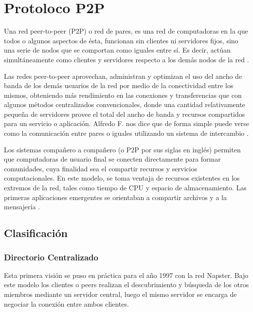 
\chapter{Protoloco P2P} %

\label{ch:protocolo_p2p} %

Una red peer-to-peer (P2P) o red de pares, es una red de computadoras en la que todos o algunos aspectos de ésta, funcionan sin clientes ni servidores fijos, sino una serie de nodos que se comportan como iguales entre sí. Es decir, actúan simultáneamente como clientes y servidores respecto a los demás nodos de la red \cite{wiki_p2p}.

Las redes peer-to-peer aprovechan, administran y optimizan el uso del ancho de banda de los demás usuarios de la red por medio de la conectividad entre los mismos, obteniendo más rendimiento en las conexiones y transferencias que con algunos métodos centralizados convencionales, donde una cantidad relativamente pequeña de servidores provee el total del ancho de banda y recursos compartidos para un servicio o aplicación.
Alfredo F. nos dice que de forma simple puede verse como la comunicación entre pares o iguales utilizando un sistema de intercambio \cite{bordignon:2005}.

Los sistemas compañero a compañero (o P2P por sus siglas en inglés) permiten que computadoras de usuario final se conecten directamente para formar comunidades, cuya finalidad sea el compartir recursos y servicios computacionales. En este modelo, se toma ventaja de recursos existentes en los extremos de la red, tales como tiempo de CPU y espacio de almacenamiento. Las primeras aplicaciones  emergentes se orientaban a compartir archivos y a la mensajería \cite{bordignon:2005}.



\section{Clasificación}

\subsection{Directorio Centralizado}

Esta primera visión se puso en práctica para el año 1997 con la red Napster. Bajo este modelo los clientes o peers realizan el descubrimiento y búsqueda de los otros miembros mediante un servidor central, luego el mismo servidor se encarga de negociar la conexión entre ambos clientes.

